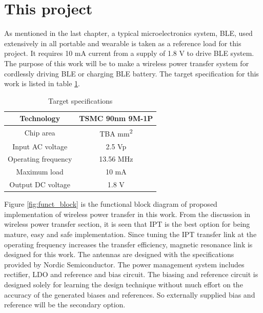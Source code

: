\documentclass[12pt,a4paper,UKenglish]{report}
\begin{document}
\section{This project}
As mentioned in the last chapter, a typical microelectronics system, BLE, used extensively in all portable and 
wearable is taken as a reference load for this project. It requires 10 mA current from a supply of 1.8 V to drive 
BLE system. The purpose of this work will be to make a wireless power transfer system for cordlessly driving BLE 
or charging BLE battery. The target specification for this work is listed in table \ref{tab:proj_spec_tar}. \\

\begin{table}[!htbp]
\caption{Target specifications}
\begin{center}
\begin{tabular}{c|c}
\hline \hline
Technology 		& TSMC 90nm 9M-1P\\ \hline
Chip area 		& TBA mm\textsuperscript{2} \\ \hline
Input AC voltage	& 2.5 Vp \\ \hline
Operating frequency  	& 13.56 MHz \\ \hline
Maximum load 		& 10 mA \\ \hline
Output DC voltage 	& 1.8 V \\ 
\hline \hline
\end{tabular}
\end{center}
\label{tab:proj_spec_tar}
\end{table}

Figure \ref{fig:funct_block} is the functional block diagram of proposed implementation of wireless power transfer in 
this work. From the discussion in wireless power transfer section, it is seen that IPT is the best option for 
being mature, easy and safe implementation. Since tuning the IPT transfer link at the operating frequency 
increases the transfer efficiency, magnetic resonance link is designed for this work. The antennas are designed 
with the specifications provided by Nordic Semiconductor. The power management system includes rectifier, LDO and reference and bias circuit. The biasing and reference circuit is designed solely for 
learning the design technique without much effort on the accuracy of the generated biases and references. So 
externally supplied bias and reference will be the secondary option. \\
\end{document}
